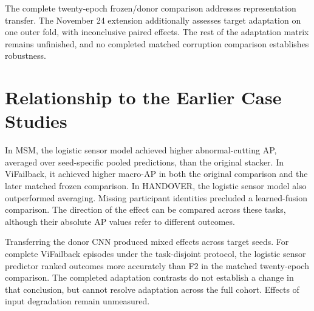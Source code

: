 The complete twenty-epoch frozen/donor comparison addresses representation transfer. The November 24 extension additionally assesses target adaptation on one outer fold, with inconclusive paired effects. The rest of the adaptation matrix remains unfinished, and no completed matched corruption comparison establishes robustness.

\section{Relationship to the Earlier Case Studies}
In MSM, the logistic sensor model achieved higher abnormal-cutting AP, averaged over seed-specific pooled predictions, than the original stacker. In ViFailback, it achieved higher macro-AP in both the original comparison and the later matched frozen comparison. In HANDOVER, the logistic sensor model also outperformed averaging. Missing participant identities precluded a learned-fusion comparison. The direction of the effect can be compared across these tasks, although their absolute AP values refer to different outcomes.

Transferring the donor CNN produced mixed effects across target seeds. For complete ViFailback episodes under the task-disjoint protocol, the logistic sensor predictor ranked outcomes more accurately than F2 in the matched twenty-epoch comparison. The completed adaptation contrasts do not establish a change in that conclusion, but cannot resolve adaptation across the full cohort. Effects of input degradation remain unmeasured.
